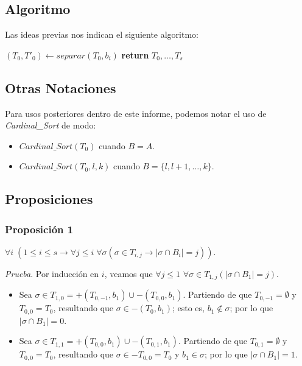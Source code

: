 \documentclass[12pt, letterpaper, twoside]{article}
\begin{document}
    \subsection{Algoritmo}
    Las ideas previas nos indican el siguiente algoritmo: 
    \begin{algorithm}
        \begin{algorithmic}[1]
                    \State $(T_0, T'_0) \leftarrow separar(T_0, b_i)$
                    \EndFor
                \EndFor
                \State \textbf{return} $T_0,\dots,T_s$
            \EndProcedure
        \end{algorithmic}
    \end{algorithm}

    \subsection{Otras Notaciones}
    Para usos posteriores dentro de este informe, podemos notar el uso de \emph{Cardinal\_Sort} de modo:
    \begin{itemize}
        \item $Cardinal\_Sort(T_0)$ cuando $B=A$.
        \item $Cardinal\_Sort(T_0, l, k)$ cuando $B=\{l, l+1,\dots,k\}$.
    \end{itemize}

    \newpage
    \subsection{Proposiciones}
    \subsubsection{Proposición 1}
    $\forall{i}\;(1\leq{i}\leq{s}\rightarrow\forall{j}\leq{i}\;\forall{\sigma}(\sigma\in{T_{i,j}}\rightarrow|\sigma\cap{B_i}|=j))$.

    \emph{Prueba}. Por inducción en $i$, veamos que $\forall{j}\leq{1}$ $\forall\sigma\in{T_{1,j}}(|\sigma\cap{B_1}|=j)$.
    \begin{itemize}
        \item Sea $\sigma\in{T_{1,0}} = +(T_{0,-1}, b_1) \cup -(T_{0,0}, b_1).$ Partiendo de que $T_{0,-1}=\emptyset$ y $T_{0,0}=T_0$, resultando que $\sigma\in{-(T_0,b_1)}$; esto es, $b_1\notin\sigma$; por lo que $|\sigma\cap{B_1}|=0$.
        \item Sea $\sigma\in{T_{1,1}} = +(T_{0,0}, b_1) \cup -(T_{0,1}, b_1).$ Partiendo de que $T_{0,1}=\emptyset$ y $T_{0,0}=T_0$, resultando que $\sigma\in{-T_{0,0}}=T_0$ y $b_1\in\sigma$; por lo que $|\sigma\cap{B_1}|=1$.
    \end{itemize}
\end{document}
